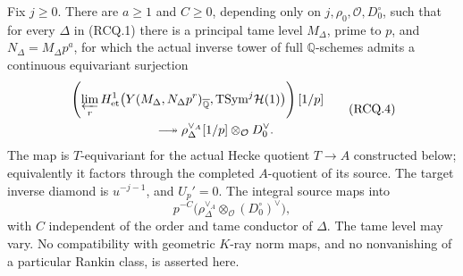 
\begin{theorem}
\label{AC-K33-ray-coefficient}
Fix \(j\ge0\). There are \(a\ge1\) and \(C\ge0\), depending only on
\(j,\rho_0,\mathcal O,D_0^\circ\), such that for every \(\Delta\)
in (RCQ.1) there is a principal tame level \(M_\Delta\), prime to \(p\),
and \(N_\Delta=M_\Delta p^a\), for which the actual inverse tower of
full \(\mathbb Q\)-schemes admits a continuous equivariant surjection
\[
 \begin{split}
 &\left(\varprojlim_r H^1_{\rm et}
  \bigl(Y(M_\Delta,N_\Delta p^r)_{\overline{\mathbb Q}},
                  {\rm TSym}^{j}\mathcal H(1)\bigr)\right)[1/p]\\
 &\hspace{24mm}\longtwoheadrightarrow
       \rho_\Delta^{\vee_A}[1/p]\otimes_{\mathcal O}D_0^\vee .
 \end{split}
 \tag{RCQ.4}
\]
The map is \(T\)-equivariant for the actual Hecke quotient \(T\to A\)
constructed below; equivalently it factors through the completed
\(A\)-quotient of its source.
The target inverse diamond is \(u^{-j-1}\), and \(U_p'=0\).
The integral source maps into
\[
 p^{-C}\bigl(\rho_\Delta^{\vee_A}\otimes_{\mathcal O}
                            (D_0^\circ)^\vee\bigr),
 \tag{RCQ.5}
\]
with \(C\) independent of the order and tame conductor of \(\Delta\).
The tame level may vary. No compatibility with geometric \(K\)-ray
norm maps, and no nonvanishing of a particular Rankin class, is
asserted here.
\end{theorem}
